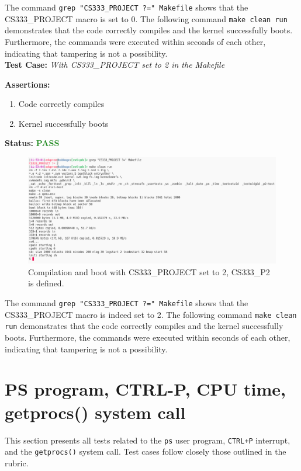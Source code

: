 \documentclass[11pt,letterpaper]{report}
\newcommand{\code}[1]{\colorbox{codegray}{\texttt{#1}}}
\begin{document}
{  The command \code{grep "CS333\_PROJECT ?=" Makefile} shows that the CS333\_PROJECT macro is set to 0.
  The following command \code{make clean run} demonstrates that the code correctly compiles and the kernel successfully boots. 
  Furthermore, the commands were executed within seconds of each other, indicating that
  tampering is not a possibility.\\

  \noindent\textbf{Test Case:} \emph{With CS333\_PROJECT set to 2 in the Makefile}
  
  \noindent\textbf{Assertions:}
  \begin{enumerate}[]
  \item Code correctly compiles
  \item Kernel successfully boots
  \end{enumerate}  
  
  \noindent\textbf{Status:} \textcolor{ForestGreen}{\textbf{PASS}}
  
  \begin{figure}[h!]
	\centering
	\includegraphics[width=1\linewidth]{compilation2.png}
	\caption[img]{Compilation and boot with CS333\_PROJECT set to 2, CS333\_P2 is defined.}
	\label{fig:P1compileP0-1}
  \end{figure}

  The command \code{grep "CS333\_PROJECT ?=" Makefile} shows that the CS333\_PROJECT macro
  is indeed set to 2. The following command \code{make clean run} demonstrates that the code
  correctly compiles and the kernel successfully boots. Furthermore, the commands were executed
  within seconds of each other, indicating that tampering is not a possibility. 

  \pagebreak

  \section*{PS program, CTRL-P, CPU time, getprocs() system call}
  This section presents all tests related to the \code{ps} user program, \code{CTRL+P}
  interrupt, and the \code{getprocs()} system call. 
  Test cases follow closely those outlined in the rubric. \hfill \break
  
}
\end{document}
